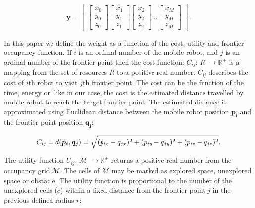 \documentclass[letterpaper, 10 pt, conference]{ieeeconf}  %
\begin{document}
\begin{equation}
   \boldsymbol{y}=\begin{bmatrix}
   \begin{bmatrix}
           x_{0} \\
           y_{0} \\
           z_{0}
   \end{bmatrix}
    \begin{bmatrix}
         x_{1} \\
         y_{1} \\
         z_{1}
    \end{bmatrix}
    \begin{bmatrix}
         x_{2} \\
         y_{2} \\
         z_{2}
    \end{bmatrix}
    \hdots
    \begin{bmatrix}
         x_{M} \\
         y_{M} \\
         z_{M}
    \end{bmatrix}
\end{bmatrix}.
\end{equation}


In this paper we define the weight as a function of the cost, utility and frontier occupancy function. If $i$ is an ordinal number of the mobile robot, and $j$ is an ordinal number of the frontier point then the cost function: $C_{ij}$: $R$ \(\rightarrow \text{$\mathbb{R}^{+}$}\) is a mapping from the set of resources $R$ to a positive real number. $C_{ij}$ describes the cost of $i$th robot to visit $j$th frontier point. The cost can be the function of the time,  energy or, like in our case, the cost is the estimated distance travelled by mobile robot to reach the target frontier point. The estimated distance is approximated using Euclidean distance between the mobile robot position $\boldsymbol{p_{i}}$ and the frontier point position $\boldsymbol{q_{j}}$:

\begin{equation}\small
    C_{ij}=d(\boldsymbol{p_{i}}, \boldsymbol{q_{j}}) = \sqrt{(p_{ix}-q_{jx})^{2}+(p_{iy}-q_{jy})^{2}+(p_{iz}-q_{jz})^{2}}.
    \label{cost}
\end{equation}

The utility function $U_{ij}$:  \(\text{$\mathcal {M}$}\) \(\rightarrow \text{$\mathbb{R}^{+}$}\) returns a positive real number from the occupancy grid \(\text{$\mathcal {M}$}\). The cells of \(\text{$\mathcal {M}$}\) may be marked as explored space, unexplored space or obstacle. The utility function is proportional to the number of the unexplored cells ($c$) within a fixed distance from the frontier point $j$ in the previous defined radius $r$: 
\end{document}
